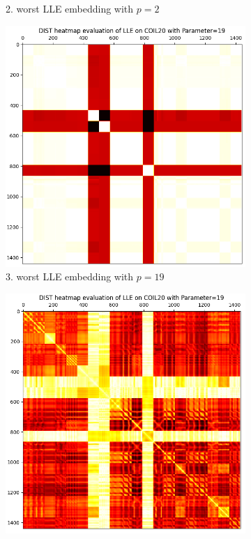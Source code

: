 \begin{figure}[!]
\begin{subfigure}[t]{0.49\columnwidth}
    	\caption{2. worst LLE embedding with $p=2$}
        \label{fig:dist_heatmap_lle_coil20_2worst}
    \end{subfigure}
     \hfill
     \begin{subfigure}[t]{0.49\columnwidth}
    	\centering
    	\includegraphics[width=\columnwidth]{images/dist_heatmap_lle_coil20_3worst_beforediff.png}
    	\caption{3. worst LLE embedding with $p=19$}
        \label{fig:dist_heatmap_lle_coil20_3worst_beforediff}
    \end{subfigure}
     \hfill
     \begin{subfigure}[t]{0.49\columnwidth}
    	\centering
    	\includegraphics[width=\columnwidth]{images/dist_heatmap_lle_coil20_3worst.png}

\end{subfigure}
\end{figure}
